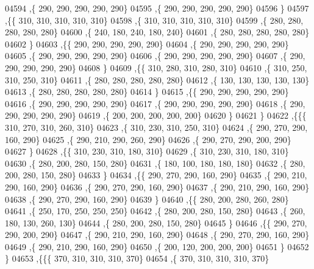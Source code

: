 \begin{DoxyCode}
04594     ,\{   290,   290,   290,   290,   290\}
04595     ,\{   290,   290,   290,   290,   290\}
04596     \}
04597    ,\{\{   310,   310,   310,   310,   310\}
04598     ,\{   310,   310,   310,   310,   310\}
04599     ,\{   280,   280,   280,   280,   280\}
04600     ,\{   240,   180,   240,   180,   240\}
04601     ,\{   280,   280,   280,   280,   280\}
04602     \}
04603    ,\{\{   290,   290,   290,   290,   290\}
04604     ,\{   290,   290,   290,   290,   290\}
04605     ,\{   290,   290,   290,   290,   290\}
04606     ,\{   290,   290,   290,   290,   290\}
04607     ,\{   290,   290,   290,   290,   290\}
04608     \}
04609    ,\{\{   310,   280,   310,   280,   310\}
04610     ,\{   310,   250,   310,   250,   310\}
04611     ,\{   280,   280,   280,   280,   280\}
04612     ,\{   130,   130,   130,   130,   130\}
04613     ,\{   280,   280,   280,   280,   280\}
04614     \}
04615    ,\{\{   290,   290,   290,   290,   290\}
04616     ,\{   290,   290,   290,   290,   290\}
04617     ,\{   290,   290,   290,   290,   290\}
04618     ,\{   290,   290,   290,   290,   290\}
04619     ,\{   200,   200,   200,   200,   200\}
04620     \}
04621    \}
04622   ,\{\{\{   310,   270,   310,   260,   310\}
04623     ,\{   310,   230,   310,   250,   310\}
04624     ,\{   290,   270,   290,   160,   290\}
04625     ,\{   290,   210,   290,   260,   290\}
04626     ,\{   290,   270,   290,   200,   290\}
04627     \}
04628    ,\{\{   310,   230,   310,   180,   310\}
04629     ,\{   310,   230,   310,   180,   310\}
04630     ,\{   280,   200,   280,   150,   280\}
04631     ,\{   180,   100,   180,   180,   180\}
04632     ,\{   280,   200,   280,   150,   280\}
04633     \}
04634    ,\{\{   290,   270,   290,   160,   290\}
04635     ,\{   290,   210,   290,   160,   290\}
04636     ,\{   290,   270,   290,   160,   290\}
04637     ,\{   290,   210,   290,   160,   290\}
04638     ,\{   290,   270,   290,   160,   290\}
04639     \}
04640    ,\{\{   280,   200,   280,   260,   280\}
04641     ,\{   250,   170,   250,   250,   250\}
04642     ,\{   280,   200,   280,   150,   280\}
04643     ,\{   260,   180,   130,   260,   130\}
04644     ,\{   280,   200,   280,   150,   280\}
04645     \}
04646    ,\{\{   290,   270,   290,   200,   290\}
04647     ,\{   290,   210,   290,   160,   290\}
04648     ,\{   290,   270,   290,   160,   290\}
04649     ,\{   290,   210,   290,   160,   290\}
04650     ,\{   200,   120,   200,   200,   200\}
04651     \}
04652    \}
04653   ,\{\{\{   370,   310,   310,   310,   370\}
04654     ,\{   370,   310,   310,   310,   370\}

\end{DoxyCode}
